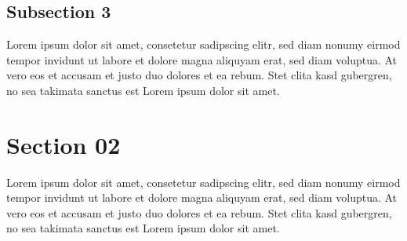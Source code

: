 \documentclass[a4paper, 11pt, oneside]{book} %
\begin{document}
\subsection{Subsection 3}
Lorem ipsum dolor sit amet, consetetur sadipscing elitr, sed diam nonumy eirmod tempor invidunt ut labore et dolore magna aliquyam erat, sed diam voluptua. At vero eos et accusam et justo duo dolores et ea rebum. Stet clita kasd gubergren, no sea takimata sanctus est Lorem ipsum dolor sit amet.
\section{Section 02} 
Lorem ipsum dolor sit amet, consetetur sadipscing elitr, sed diam nonumy eirmod tempor invidunt ut labore et dolore magna aliquyam erat, sed diam voluptua. At vero eos et accusam et justo duo dolores et ea rebum. Stet clita kasd gubergren, no sea takimata sanctus est Lorem ipsum dolor sit amet.
\end{document}
